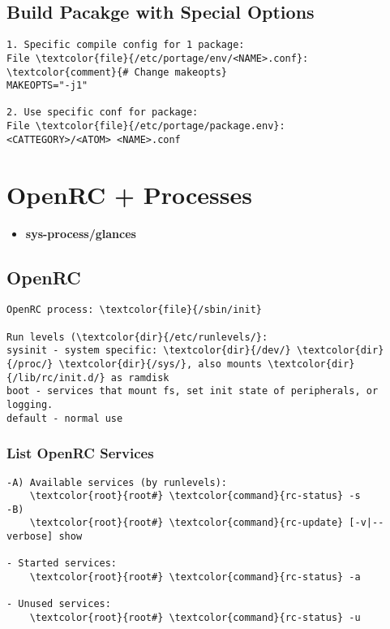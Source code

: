 \documentclass[10pt, a4paper, onecolumn, openany]{book}         %
\begin{document}
\section{Build Pacakge with Special Options}
\begin{Verbatim}[commandchars=\\\{\}]
1. Specific compile config for 1 package:
File \textcolor{file}{/etc/portage/env/<NAME>.conf}:
\textcolor{comment}{# Change makeopts}
MAKEOPTS="-j1"

2. Use specific conf for package:
File \textcolor{file}{/etc/portage/package.env}:
<CATTEGORY>/<ATOM> <NAME>.conf
\end{Verbatim}




\chapter{OpenRC + Processes}%
\begin{itemize}
    \item \textbf{sys-process/glances}
\end{itemize}
\section{OpenRC}
\begin{Verbatim}[commandchars=\\\{\}]
OpenRC process: \textcolor{file}{/sbin/init}

Run levels (\textcolor{dir}{/etc/runlevels/}:
sysinit - system specific: \textcolor{dir}{/dev/} \textcolor{dir}{/proc/} \textcolor{dir}{/sys/}, also mounts \textcolor{dir}{/lib/rc/init.d/} as ramdisk
boot - services that mount fs, set init state of peripherals, or logging.
default - normal use
\end{Verbatim}

\subsection{List OpenRC Services}
\begin{Verbatim}[commandchars=\\\{\}]
-A) Available services (by runlevels):
    \textcolor{root}{root#} \textcolor{command}{rc-status} -s
-B)
    \textcolor{root}{root#} \textcolor{command}{rc-update} [-v|--verbose] show
    
- Started services:
    \textcolor{root}{root#} \textcolor{command}{rc-status} -a
    
- Unused services:
    \textcolor{root}{root#} \textcolor{command}{rc-status} -u
\end{Verbatim}
\end{document}
